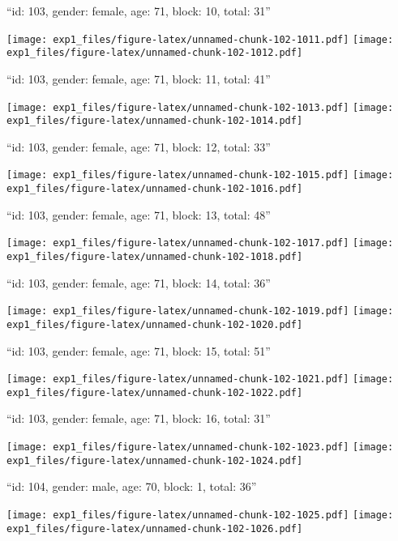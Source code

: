 \documentclass[11pt,,]{article}
\begin{document}
\newpage
[1] 

``id: 103, gender: female, age: 71, block: 10, total: 31''

\texttt{[image: exp1\_files/figure-latex/unnamed-chunk-102-1011.pdf]}
\texttt{[image: exp1\_files/figure-latex/unnamed-chunk-102-1012.pdf]}

\newpage
[1] 

``id: 103, gender: female, age: 71, block: 11, total: 41''

\texttt{[image: exp1\_files/figure-latex/unnamed-chunk-102-1013.pdf]}
\texttt{[image: exp1\_files/figure-latex/unnamed-chunk-102-1014.pdf]}

\newpage
[1] 

``id: 103, gender: female, age: 71, block: 12, total: 33''

\texttt{[image: exp1\_files/figure-latex/unnamed-chunk-102-1015.pdf]}
\texttt{[image: exp1\_files/figure-latex/unnamed-chunk-102-1016.pdf]}

\newpage
[1] 

``id: 103, gender: female, age: 71, block: 13, total: 48''

\texttt{[image: exp1\_files/figure-latex/unnamed-chunk-102-1017.pdf]}
\texttt{[image: exp1\_files/figure-latex/unnamed-chunk-102-1018.pdf]}

\newpage
[1] 

``id: 103, gender: female, age: 71, block: 14, total: 36''

\texttt{[image: exp1\_files/figure-latex/unnamed-chunk-102-1019.pdf]}
\texttt{[image: exp1\_files/figure-latex/unnamed-chunk-102-1020.pdf]}

\newpage
[1] 

``id: 103, gender: female, age: 71, block: 15, total: 51''

\texttt{[image: exp1\_files/figure-latex/unnamed-chunk-102-1021.pdf]}
\texttt{[image: exp1\_files/figure-latex/unnamed-chunk-102-1022.pdf]}

\newpage
[1] 

``id: 103, gender: female, age: 71, block: 16, total: 31''

\texttt{[image: exp1\_files/figure-latex/unnamed-chunk-102-1023.pdf]}
\texttt{[image: exp1\_files/figure-latex/unnamed-chunk-102-1024.pdf]}

\newpage
[1] 

``id: 104, gender: male, age: 70, block: 1, total: 36''

\texttt{[image: exp1\_files/figure-latex/unnamed-chunk-102-1025.pdf]}
\texttt{[image: exp1\_files/figure-latex/unnamed-chunk-102-1026.pdf]}
\end{document}

